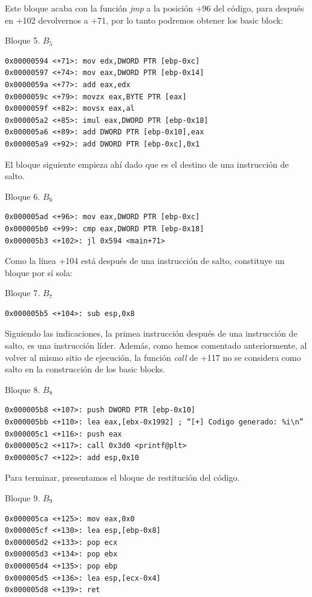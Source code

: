 \documentclass[12pt,twoside]{article}
\begin{document}
Este bloque acaba con la función \textit{jmp} a la posición +96 del código, para después en +102 devolvernos a +71, por lo tanto podremos obtener los basic block:
\begin{center}
Bloque 5. $B_5$
\end{center}
\begin{verbatim}
0x00000594 <+71>: mov edx,DWORD PTR [ebp-0xc]
0x00000597 <+74>: mov eax,DWORD PTR [ebp-0x14]
0x0000059a <+77>: add eax,edx
0x0000059c <+79>: movzx eax,BYTE PTR [eax]
0x0000059f <+82>: movsx eax,al
0x000005a2 <+85>: imul eax,DWORD PTR [ebp-0x18]
0x000005a6 <+89>: add DWORD PTR [ebp-0x10],eax
0x000005a9 <+92>: add DWORD PTR [ebp-0xc],0x1
\end{verbatim}
El bloque siguiente empieza ahí dado que es el destino de una instrucción de salto. 
\begin{center}
Bloque 6. $B_6$
\end{center}
\begin{verbatim}
0x000005ad <+96>: mov eax,DWORD PTR [ebp-0xc]
0x000005b0 <+99>: cmp eax,DWORD PTR [ebp-0x18]
0x000005b3 <+102>: jl 0x594 <main+71>
\end{verbatim}

Como la línea +104 está después de una instrucción de salto, constituye un bloque por sí sola:
\begin{center}
Bloque 7. $B_7$
\end{center}
\begin{verbatim}
0x000005b5 <+104>: sub esp,0x8
\end{verbatim}

Siguiendo las indicaciones, la primea instrucción después de una instrucción de salto, es una instrucción líder. Además, como hemos comentado anteriormente, al volver al mismo sitio de ejecución, la función \textit{call} de +117 no se considera como salto en la construcción de los basic blocks.

\begin{center}
Bloque 8. $B_8$
\end{center}
\begin{verbatim}
0x000005b8 <+107>: push DWORD PTR [ebp-0x10]
0x000005bb <+110>: lea eax,[ebx-0x1992] ; “[+] Codigo generado: %i\n”
0x000005c1 <+116>: push eax
0x000005c2 <+117>: call 0x3d0 <printf@plt>
0x000005c7 <+122>: add esp,0x10
\end{verbatim}

Para terminar, presentamos el bloque de restitución del código. 

\begin{center}
Bloque 9. $B_9$
\end{center}
\begin{verbatim}
0x000005ca <+125>: mov eax,0x0
0x000005cf <+130>: lea esp,[ebp-0x8]
0x000005d2 <+133>: pop ecx
0x000005d3 <+134>: pop ebx
0x000005d4 <+135>: pop ebp
0x000005d5 <+136>: lea esp,[ecx-0x4]
0x000005d8 <+139>: ret
\end{verbatim}
\end{document}
